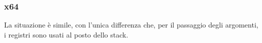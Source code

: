 \subsubsection{x64}

La situazione è simile, con l'unica differenza che, per il passaggio degli argomenti, i registri sono usati al posto dello stack.







